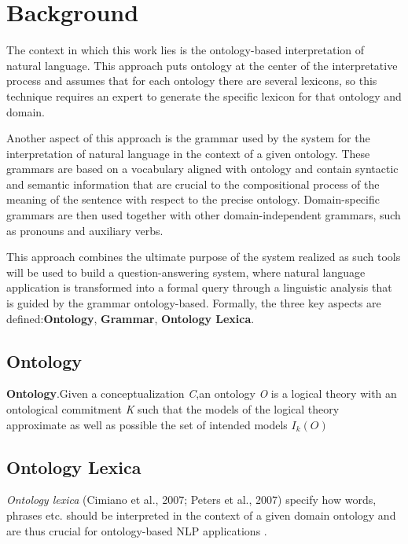 \section{Background}
\label{sec:background}
The context in which this work lies is the ontology-based interpretation of natural language. This approach puts ontology at the center of the interpretative process and assumes that for each ontology there are several lexicons, so this technique requires an expert to generate the specific lexicon for that ontology and domain.

Another aspect of this approach is the grammar used by the system for the interpretation of natural language in the context of a given ontology. These grammars are based on a vocabulary aligned with ontology and contain syntactic and semantic information that are crucial to the compositional process of the meaning of the sentence with respect to the precise ontology.
Domain-specific grammars are then used together with other domain-independent grammars, such as pronouns and auxiliary verbs.

%
This approach combines the ultimate purpose of the system realized as such tools will be used to build a question-answering system, where natural language application is transformed into a formal query through a linguistic analysis that is guided by the grammar ontology-based.
Formally, the three key aspects are defined:\textbf{Ontology}, \textbf{Grammar}, \textbf{Ontology Lexica}.

\subsection{Ontology}
\theoremstyle{definition}
\begin{definition}
\newtheorem{defn}{Definition}[section]{\textbf{Ontology}.Given a conceptualization \textit{C},an ontology \textit{O} is a logical theory with an ontological commitment  \textit{K} such that the models of the logical theory approximate as well as possible the set of intended models \begin{math}I_k(O)\end{math}}
\end{definition}

\subsection{Ontology Lexica}

\textit{Ontology lexica} (Cimiano et al., 2007; Peters et al., 2007) specify how words, phrases etc. should
be interpreted in the context of a given domain ontology
and are thus crucial for ontology-based NLP applications \cite{mccrae2012three} .


